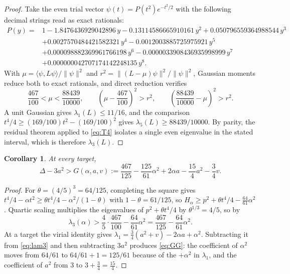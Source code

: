 \documentclass[11pt,reqno]{amsart}
\theoremstyle{plain}
\newtheorem{corollary}[theorem]{Corollary}
\theoremstyle{definition}
\theoremstyle{remark}
\numberwithin{equation}{section}
\begin{document}
\begin{proof}
  Take the even trial vector $\psi(t)=P(t^2)e^{-t^2/2}$ with the following
  decimal strings read as exact rationals:
  \begin{equation}
    \label{eq:T3}
    \begin{aligned}
      P(y)={}&1-1.8476436929042896\,y-0.13114586665910161\,y^2
        +0.050796559364988544\,y^3\\
      &+0.0027570484421582321\,y^4-0.0012003885725975921\,y^5\\
      &+0.000098882369961766198\,y^6-0.0000033908436935998999\,y^7\\
      &+0.000000042707174142248135\,y^8 .
    \end{aligned}
  \end{equation}
  With $\mu=\langle\psi,L\psi\rangle/\lVert\psi\rVert^2$ and
  $r^2=\lVert(L-\mu)\psi\rVert^2/\lVert\psi\rVert^2$, Gaussian moments
  reduce both to exact rationals, and direct reduction verifies
  \begin{equation}
    \label{eq:T4}
    \frac{467}{100}<\mu<\frac{88439}{10000},
    \qquad
    \left(\mu-\frac{467}{100}\right)^2>r^2,
    \qquad
    \left(\frac{88439}{10000}-\mu\right)^2>r^2 .
  \end{equation}
  A unit Gaussian gives $\lambda_1(L)\le11/16$, and the comparison
  $t^4/4\ge(169/100)t^2-(169/100)^2$ gives
  $\lambda_5(L)\ge88439/10000$. By parity, the residual theorem applied to
  \eqref{eq:T4} isolates a single even eigenvalue in the stated interval,
  which is therefore $\lambda_3(L)$.
\end{proof}

\begin{corollary}
  \label{cor:G}
  At every target,
  \begin{equation}
    \label{eq:GG}
    \Delta-3a^2>G(\alpha,a,v):=
      \frac{467}{125}-\frac{125}{61}\alpha^2+2\alpha a
      -\frac{15}{4}a^2-\frac34v .
  \end{equation}
\end{corollary}

\begin{proof}
  For $\theta=(4/5)^3=64/125$, completing the square gives
  $t^4/4-\alpha t^2\ge\theta t^4/4-\alpha^2/(1-\theta)$ with
  $1-\theta=61/125$, so
  $H_\alpha\ge p^2+\theta t^4/4-\tfrac{64}{61}\alpha^2$. Quartic scaling
  multiplies the eigenvalues of $p^2+\theta t^4/4$ by
  $\theta^{1/3}=4/5$, so by 
  \begin{equation}
    \label{eq:lam3}
    \lambda_3(\alpha)>\frac45\cdot\frac{467}{100}-\frac{64}{61}\alpha^2
    =\frac{467}{125}-\frac{64}{61}\alpha^2 .
  \end{equation}
  At a target the virial identity gives
  $\lambda_1=\tfrac34(a^2+v)-2\alpha a+\alpha^2$. Subtracting it from
  \eqref{eq:lam3} and then subtracting $3a^2$ produces \eqref{eq:GG}: the
  coefficient of $\alpha^2$ moves from $64/61$ to
  $64/61+1=125/61$ because of the $+\alpha^2$ in $\lambda_1$, and the
  coefficient of $a^2$ from $3$ to $3+\tfrac34=\tfrac{15}4$.
\end{proof}
\end{document}

